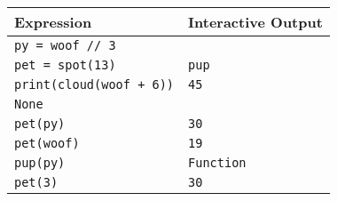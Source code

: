 \documentclass{exam}
\begin{document}
\begin{questions}
\begin{solution}
\begin{center}
\begin{tabular}{|m{8cm}|m{6cm}|}
\hline
\textbf{Expression} & \textbf{Interactive Output} \\
\hline
\lstinline$py = woof // 3$ & \\ [2em]
\hline
\lstinline$pet = spot(13)$ & \color{red}\texttt{pup} \\ [3em]
\hline
\lstinline$print(cloud(woof + 6))$ & \color{red}\texttt{45} \\ \texttt{None} \\ [3em]
\hline
\lstinline$pet(py)$ & \color{red}\texttt{30} \\ [3em]
\hline
\lstinline$pet(woof)$& \color{red}\texttt{19} \\ [3em]
\hline
\lstinline$pup(py)$ & \color{red}\texttt{Function} \\ [3em]
\hline
\lstinline$pet(3)$ & \color{red}\texttt{30} \\ [3em]
\hline
\end{tabular}
\end{center}
\end{solution}


\end{questions}
\end{document}
